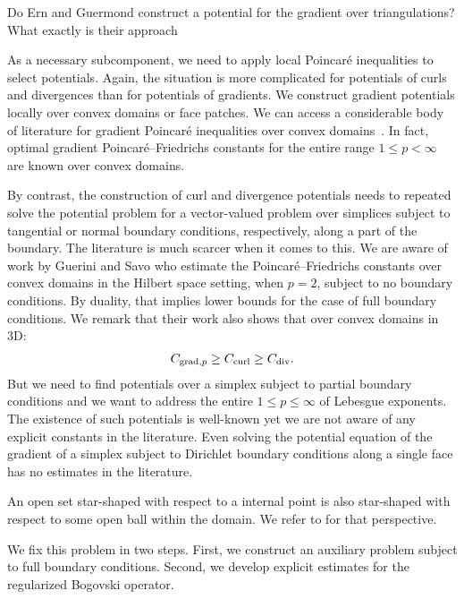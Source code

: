 \documentclass[a4paper]{amsart}
\begin{document}
\color{red}Do Ern and Guermond construct a potential for the gradient over triangulations? What exactly is their approach\color{black}
\nocite{gross2004electromagnetic,hiptmair2002finite}

As a necessary subcomponent, we need to apply local Poincar\'e inequalities to select potentials. 
Again, the situation is more complicated for potentials of curls and divergences than for potentials of gradients. 
We construct gradient potentials locally over convex domains or face patches. 
We can access a considerable body of literature for gradient Poincar\'e inequalities over convex domains~\cite{bebendorf2003note}. In fact, optimal gradient Poincar\'e--Friedrichs constants for the entire range $1 \leq p < \infty$ are known over convex domains. 

By contrast, the construction of curl and divergence potentials needs to repeated solve the potential problem for a vector-valued problem over simplices subject to tangential or normal boundary conditions, respectively, along a part of the boundary.
The literature is much scarcer when it comes to this. 
We are aware of work by Guerini and Savo who estimate the Poincar\'e--Friedrichs constants over convex domains in the Hilbert space setting, when $p=2$, subject to no boundary conditions.
By duality, that implies lower bounds for the case of full boundary conditions.
We remark that their work also shows that over convex domains in 3D:
\begin{align*}
    C_{\operatorname{grad},p} \geq C_{\operatorname{curl}} \geq C_{\operatorname{div}}.
\end{align*}
But we need to find potentials over a simplex subject to partial boundary conditions 
and we want to address the entire $1 \leq p \leq \infty$ of Lebesgue exponents. 
The existence of such potentials is well-known yet we are not aware of any explicit constants in the literature.
Even solving the potential equation of the gradient of a simplex subject to Dirichlet boundary conditions along a single face 
has no estimates in the literature. 

An open set star-shaped with respect to a internal point is also star-shaped with respect to some open ball within the domain.
We refer to \cite{hurri1988poincare} for that perspective.

We fix this problem in two steps. 
First, we construct an auxiliary problem subject to full boundary conditions.
Second, we develop explicit estimates for the regularized Bogovski operator. 


\end{document}

